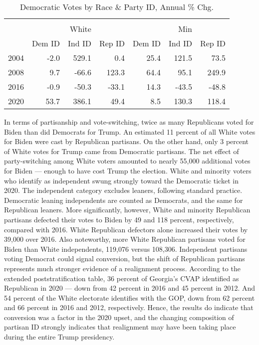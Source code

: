 \begin{table}[H]
\centering
\caption{Democratic Votes by Race \& Party ID, Annual \% Chg.}
\label{tab:extended-demvotes}
\begin{threeparttable}
\begin{tabular}{rrrr|rrr}
  \hline \\ 
   &    &White  &   &   & Min  &   \\ \vspace{0.5em} 
 &   Dem ID & Ind ID &  Rep ID &  Dem ID &  Ind ID &  Rep ID \\ 
  \hline
 2004 & -2.0 & 529.1 & 0.4 & 25.4 & 121.5 & 73.5 \\ 
  2008 & 9.7 & -66.6 & 123.3 & 64.4 & 95.1 & 249.9 \\ 
  2016 & -0.9 & -50.3 & -33.1 & 14.3 & -43.5 & -48.8 \\ 
  2020 & 53.7 & 386.1 & 49.4 & 8.5 & 130.3 & 118.4 \\ 
   \hline
\end{tabular}
\end{threeparttable}
\end{table}

In terms of partisanship and vote-switching, twice as many Republicans voted for Biden than did Democrats for Trump. An estimated 11 percent of all White votes for Biden were cast by Republican partisans. On the other hand, only 3 percent of White votes for Trump came from Democratic partisans. The net effect of party-switching among White voters amounted to nearly 55,000 additional votes for Biden --- enough to have cost Trump the election. White and minority voters who identify as independent swung strongly toward the Democratic ticket in 2020. The independent category excludes leaners, following standard practice. Democratic leaning independents are counted as Democrats, and the same for Republican leaners. More significantly, however, White and minority Republican partisans defected their votes to Biden by 49 and 118 percent, respectively, compared with 2016. White Republican defectors alone increased their votes by 39,000 over 2016. Also noteworthy, more White Republican partisans voted for Biden than White independents, 119,076 versus 108,306. Independent partisans voting Democrat could signal conversion, but the shift of Republican partisans represents much stronger evidence of a realignment process. According to the extended poststratification table, 36 percent of Georgia's CVAP identified as Republican in 2020 --- down from 42 percent in 2016 and 45 percent in 2012. And 54 percent of the White electorate identifies with the GOP, down from 62 percent and 66 percent in 2016 and 2012, respectively. Hence, the results do indicate that conversion was a factor in the 2020 upset, and the changing composition of partisan ID strongly indicates that realignment may have been taking place during the entire Trump presidency.     


